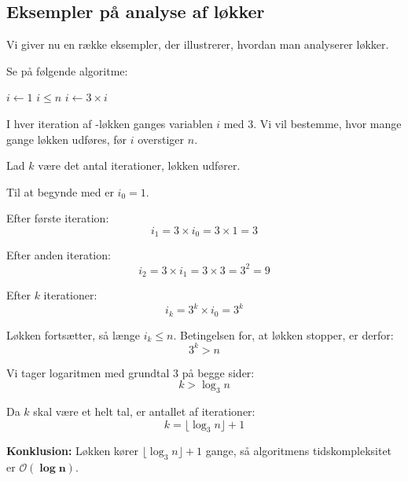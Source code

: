 \subsection*{Eksempler på analyse af løkker}
Vi giver nu en række eksempler, der illustrerer, hvordan man analyserer løkker.

\begin{example}

    Se på følgende algoritme:
    
    \begin{codebox}
        \li $i \gets 1$
        \li \While $i \leq n$ \Do
        \li     $i \gets 3 \times i$
            \End
    \end{codebox}
    
    I hver iteration af \texttt{\While}-løkken ganges variablen $i$ med $3$. Vi vil bestemme, hvor mange gange løkken udføres, før $i$ overstiger $n$.
    
    Lad $k$ være det antal iterationer, løkken udfører.
    
    Til at begynde med er $i_0 = 1$.
    
    Efter første iteration:
    \[ i_1 = 3 \times i_0 = 3 \times 1 = 3 \]
    
    Efter anden iteration:
    \[ i_2 = 3 \times i_1 = 3 \times 3 = 3^2 = 9 \]
    
    Efter $k$ iterationer:
    \[ i_k = 3^k \times i_0 = 3^k \]
    
    Løkken fortsætter, så længe $i_k \leq n$. Betingelsen for, at løkken stopper, er derfor:
    \[ 3^k > n \]
    
    Vi tager logaritmen med grundtal $3$ på begge sider:
    \[ k > \log_3 n \]
    
    Da $k$ skal være et helt tal, er antallet af iterationer:
    \[ k = \lfloor \log_3 n \rfloor + 1 \]
    
    \textbf{Konklusion:} Løkken kører $\lfloor \log_3 n \rfloor + 1$ gange, så algoritmens tidskompleksitet er $\boldsymbol{\mathcal{O}(\log n)}$.
    
\end{example}
    
